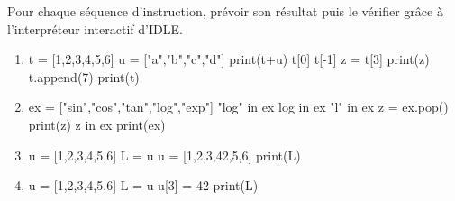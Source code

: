 Pour chaque séquence d'instruction, prévoir son résultat puis le vérifier grâce à l'interpréteur interactif d'IDLE.

\begin{enumerate}[label=\emph{\alph*)}]
\item 
\begin{pyverbatim}
t = [1,2,3,4,5,6]
u = ["a","b","c","d"]
print(t+u)
t[0]
t[-1]
z = t[3]
print(z)
t.append(7)
print(t)
\end{pyverbatim}
\item 
\begin{pyverbatim}
ex = ["sin","cos","tan","log","exp"]
"log" in ex
log in ex
"l" in ex
z = ex.pop()
print(z)
z in ex
print(ex)
\end{pyverbatim}
\item 
\begin{pyverbatim}
  u = [1,2,3,4,5,6]
  L = u
  u = [1,2,3,42,5,6]
  print(L)
\end{pyverbatim}
\item 
\begin{pyverbatim}
  u = [1,2,3,4,5,6]
  L = u
  u[3] = 42
  print(L)
\end{pyverbatim}
\end{enumerate}